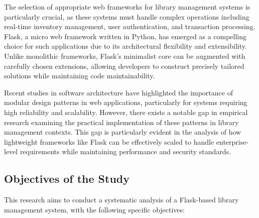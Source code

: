 \documentclass{article}
\begin{document}
The selection of appropriate web frameworks for library management systems is particularly crucial, as these systems must handle complex operations including real-time inventory management, user authentication, and transaction processing\cite{werkzeug2023}. Flask, a micro web framework written in Python\cite{python2023}, has emerged as a compelling choice for such applications due to its architectural flexibility and extensibility\cite{flask2023}. Unlike monolithic frameworks, Flask's minimalist core can be augmented with carefully chosen extensions, allowing developers to construct precisely tailored solutions while maintaining code maintainability\cite{stackoverflow2023}.

Recent studies in software architecture\cite{anderson2023,zhang2022} have highlighted the importance of modular design patterns in web applications, particularly for systems requiring high reliability and scalability. However, there exists a notable gap in empirical research examining the practical implementation of these patterns in library management contexts. This gap is particularly evident in the analysis of how lightweight frameworks like Flask can be effectively scaled to handle enterprise-level requirements while maintaining performance and security standards\cite{davis2022}.

\subsection{Objectives of the Study}

This research aims to conduct a systematic analysis of a Flask-based library management system, with the following specific objectives:
\end{document}

